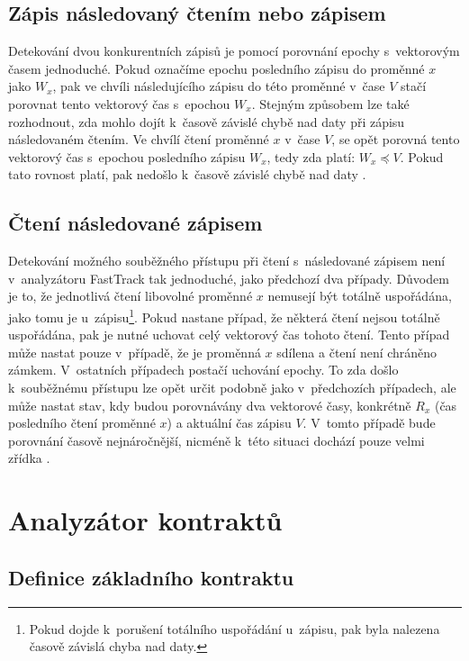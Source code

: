 \subsection{Zápis následovaný čtením nebo zápisem}

Detekování dvou konkurentních zápisů je pomocí porovnání epochy s~vektorovým časem jednoduché. Pokud označíme epochu posledního zápisu do proměnné $x$ jako $W_x$, pak ve chvíli následujícího zápisu do této proměnné v~čase $V$ stačí porovnat tento vektorový čas s~epochou $W_x$. Stejným způsobem lze také rozhodnout, zda mohlo dojít k~časově závislé chybě nad daty při zápisu následovaném čtením. Ve chvílí čtení proměnné $x$ v~čase $V$, se opět porovná tento vektorový čas s~epochou posledního zápisu $W_x$, tedy zda platí: $W_x \preceq V$. Pokud tato rovnost platí, pak nedošlo k~časově závislé chybě nad daty \cite{cite:ft}.

\subsection{Čtení následované zápisem}

Detekování možného souběžného přístupu při čtení s~následované zápisem není v~analyzátoru FastTrack tak jednoduché, jako předchozí dva případy. Důvodem je to, že jednotlivá čtení libovolné proměnné $x$ nemusejí být totálně uspořádána, jako tomu je u~zápisu\footnote{Pokud dojde k~porušení totálního uspořádání u~zápisu, pak byla nalezena časově závislá chyba nad daty.}. Pokud nastane případ, že některá čtení nejsou totálně uspořádána, pak je nutné uchovat celý vektorový čas tohoto čtení. Tento případ může nastat pouze v~případě, že je proměnná $x$ sdílena a čtení není chráněno zámkem. V~ostatních případech postačí uchování epochy. To zda došlo k~souběžnému přístupu lze opět určit podobně jako v~předchozích případech, ale může nastat stav, kdy budou porovnávány dva vektorové časy, konkrétně $R_x$ (čas posledního čtení proměnné $x$) a aktuální čas zápisu $V$. V~tomto případě bude porovnání časově nejnáročnější, nicméně k~této situaci dochází pouze velmi zřídka \cite{cite:ft}.


\section{Analyzátor kontraktů}

\subsection{Definice základního kontraktu}\label{contract-basic}

